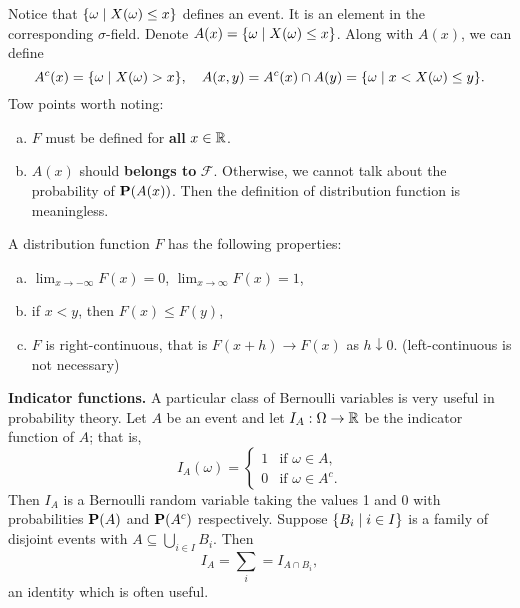 Notice that $\{ \omega \;\vert\; X(\omega) \leq x\}$ defines an event. It is an element in the corresponding $\sigma$-field. Denote $A(x) = \{ \omega \;\vert\; X(\omega) \leq x \}$. Along with $A(x)$, we can define
\begin{equation*}
    A^c(x) = \{ \omega \;\vert\; X(\omega) > x \}, \quad A(x, y) = A^c(x) \cap A(y) = \{ \omega \;\vert\; x < X(\omega) \leq y \}.
\end{equation*}
Tow points worth noting:
\begin{enumerate}[(a)]
    \item $F$ must be defined for \textbf{all} $x \in \mathbb{R}$.
    \item $A(x)$ should \textbf{belongs to} $\mathcal{F}$. Otherwise, we cannot talk about the probability of $\mathbf{P}(A(x))$. Then the definition of distribution function is meaningless.
\end{enumerate}

\begin{lemma}
A distribution function $F$ has the following properties:
\begin{enumerate}[(a)]
    \item $\lim_{x \to -\infty}F(x) = 0$, $\lim_{x\to\infty} F(x) = 1$,
    \item if $x < y$, then $F(x) \leq F(y)$,
    \item $F$ is right-continuous, that is $F(x+h) \to F(x)$ as $h \downarrow 0$. (left-continuous is not necessary)
\end{enumerate}
\end{lemma}

\begin{example}
\textbf{Indicator functions.} A particular class of Bernoulli variables is very useful in probability theory. Let $A$ be an event and let $I_A : \Omega \to \mathbb{R}$ be the indicator function of $A$; that is,
\begin{equation*}
    I_A(\omega) = \begin{cases} 1 & \text{if $\omega \in A$}, \\ 0 & \text{if $\omega \in A^c$}. \end{cases}
\end{equation*}
Then $I_A$ is a Bernoulli random variable taking the values 1 and 0 with probabilities $\mathbf{P}(A)$ and $\mathbf{P}(A^c)$ respectively. Suppose $\{B_i \;\vert\; i \in I\}$ is a family of disjoint events with $A \subseteq \bigcup_{i\in I} B_i$. Then 
\begin{equation*}
    I_A = \sum_{i} = I_{A\cap B_i},
\end{equation*}
an identity which is often useful.
\end{example}

